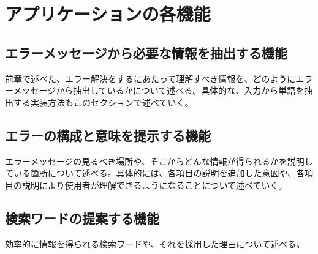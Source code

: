 \documentclass[main]{subfiles}
\begin{document}
\chapter{アプリケーションの各機能}
\section{エラーメッセージから必要な情報を抽出する機能}
前章で述べた、エラー解決をするにあたって理解すべき情報を、どのようにエラーメッセージから抽出しているかについて述べる。具体的な、入力から単語を抽出する実装方法もこのセクションで述べていく。

\section{エラーの構成と意味を提示する機能}
エラーメッセージの見るべき場所や、そこからどんな情報が得られるかを説明している箇所について述べる。具体的には、各項目の説明を追加した意図や、各項目の説明により使用者が理解できるようになることについて述べていく。

\section{検索ワードの提案する機能}
効率的に情報を得られる検索ワードや、それを採用した理由について述べる。
\end{document}
